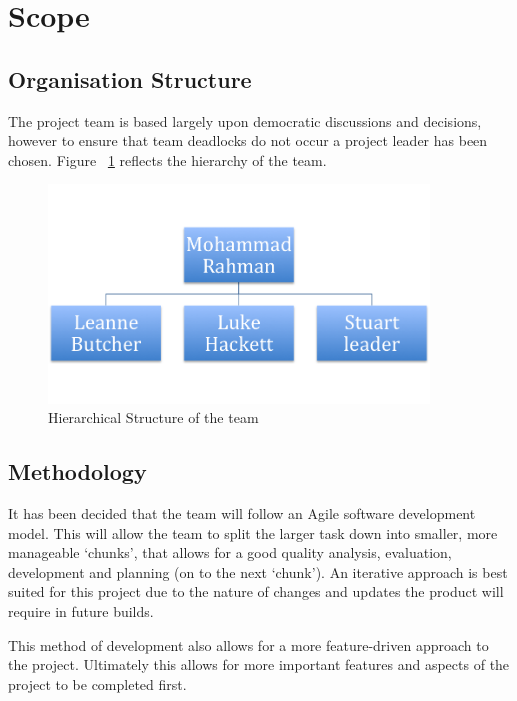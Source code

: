 \section{Scope}

\subsection{Organisation Structure}

The project team is based largely upon democratic discussions and decisions,
however to ensure that team deadlocks do not occur a project leader has been
chosen. Figure ~\ref{fig:org_hierachy} reflects the hierarchy of the team.

\begin{figure}[H]
  \centering
  \includegraphics[width=0.9\textwidth]{org_hierachy.png}
  \caption{Hierarchical Structure of the team}
  \label{fig:org_hierachy}
\end{figure}


\subsection{Methodology}

It has been decided that the team will follow an Agile software development
model. This will allow the team to split the larger task down into smaller, more
manageable `chunks', that allows for a good quality analysis, evaluation,
development and planning (on to the next `chunk'). An iterative approach is best
suited for this project due to the nature of changes and updates the product
will require in future builds.

This method of development also allows for a more feature-driven approach to the
project. Ultimately this allows for more important features and aspects of the
project to be completed first.


